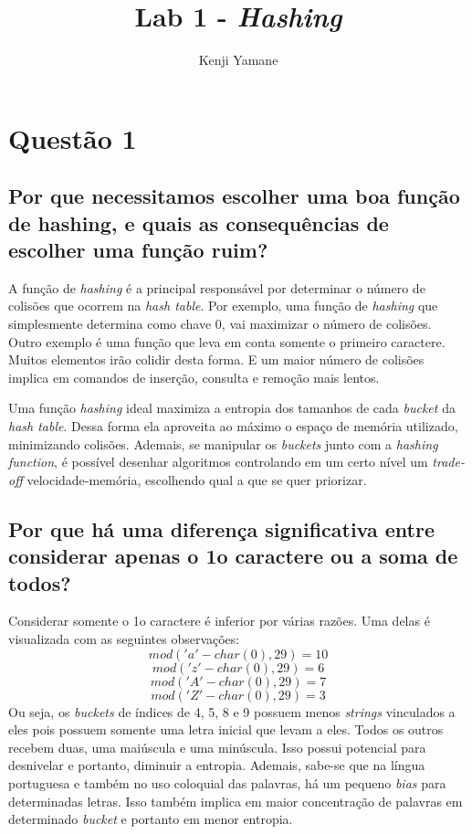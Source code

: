 \documentclass{article}[twocolumn]
\title{Lab 1 - \textit{Hashing}}
\author{Kenji Yamane}
\begin{document}
	\maketitle
	\section{Quest\~ao 1}
	\subsection{Por que necessitamos escolher uma boa função de hashing, e quais as consequências
	de escolher uma função ruim?}
	A fun\c{c}\~ao de \textit{hashing} \'e a principal respons\'avel por determinar
	o n\'umero de colis\~oes que ocorrem na \textit{hash table}. Por exemplo, uma fun\c{c}\~ao
	de \textit{hashing} que simplesmente determina como chave 0, vai maximizar o n\'umero
	de colis\~oes. Outro exemplo \'e uma fun\c{c}\~ao que leva em conta somente o primeiro
	caractere. Muitos elementos ir\~ao colidir desta forma. E um maior n\'umero de colis\~oes
	implica em comandos de inser\c{c}\~ao, consulta e remo\c{c}\~ao mais lentos.

	Uma fun\c{c}\~ao \textit{hashing} ideal maximiza a entropia dos tamanhos de cada
	\textit{bucket} da \textit{hash table}. Dessa forma ela aproveita ao m\'aximo o espa\c{c}o
	de mem\'oria utilizado, minimizando colis\~oes. Ademais, se manipular os \textit{buckets}
	junto com a \textit{hashing function}, \'e poss\'ivel desenhar algoritmos controlando
	em um certo n\'ivel um \textit{trade-off} velocidade-mem\'oria, escolhendo qual a que se
	quer priorizar.

	\subsection{Por que h\'a uma diferen\c{c}a significativa entre considerar apenas o 1o
	caractere ou a soma de todos?}
	Considerar somente o 1o caractere \'e inferior por v\'arias raz\~oes. Uma delas \'e
	visualizada com as seguintes observa\c{c}\~oes:
	\begin{equation}
		mod('a' - char(0), 29) = 10
		\nonumber
	\end{equation}
	\begin{equation}
		mod('z' - char(0), 29) = 6
		\nonumber
	\end{equation}
	\begin{equation}
		mod('A' - char(0), 29) = 7
		\nonumber
	\end{equation}
	\begin{equation}
		mod('Z' - char(0), 29) = 3
		\nonumber
	\end{equation}
	Ou seja, os \textit{buckets} de \'indices de 4, 5, 8 e 9 possuem menos \textit{strings}
	vinculados a eles pois possuem somente uma letra inicial que levam a eles. Todos os outros
	recebem duas, uma mai\'uscula e uma min\'uscula. Isso possui potencial para desnivelar
	e portanto, diminuir a entropia. Ademais, sabe-se que na l\'ingua portuguesa e tamb\'em
	no uso coloquial das palavras, h\'a um pequeno \textit{bias} para determinadas letras.
	Isso tamb\'em implica em maior concentra\c{c}\~ao de palavras em determinado \textit{bucket}
	e portanto em menor entropia.
\end{document}
